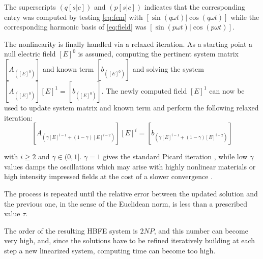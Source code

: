 \documentclass[journal]{IEEEtran}
\begin{document}
\noindent The superscripts $(q[s|c])$ and $(p[s|c])$ indicates that the corresponding
entry was computed by testing \eqref{eq:fem} with $[\sin(q \omega t) | \cos(q \omega t)]$ 
while the corresponding harmonic basis of \eqref{eq:field}
was $[\sin(p \omega t) | \cos(p \omega t)]$.

The nonlinearity is finally handled via a
relaxed iteration. As a starting point a null electric field $[E]^0$ is assumed,
computing the pertinent system matrix $[A_{([E]^0)}]$ and
known term $[b_{([E]^0)}]$ and solving the system $[A_{([E]^0)}] [E]^1 =
[b_{([E]^0)}]$. The newly computed field $[E]^1$ can now be used to update system
matrix and known term and perform the following relaxed iteration:
\begin{equation} \label{eq:lastLinearSystem}
 [A_{(\gamma [E]^{i-1} + (1-\gamma) [E]^{i-2})}] [E]^{i} = [b_{(\gamma [E]^{i-1}
 + (1-\gamma) [E]^{i-2})}]
\end{equation}
% 

\noindent with $i \geq 2$ and
$\gamma\in(0,1]$. $\gamma=1$ gives the standard Picard iteration
\cite{Guarnieri2010}, while low $\gamma$ values damps the oscillations
which may arise with highly nonlinear materials or high intensity impressed
fields at the cost of a slower convergence \cite{Silvester1997}.

The process is repeated until the relative error between the updated solution
and the previous one, in the sense of the Euclidean norm, is less than a
prescribed value $\tau$.

The order of the resulting HBFE system is $2 N P$, and
this number can become very high, and, since the
solutions have to be refined iteratively building at each step a new linearized
system, computing time can become too high. 
\end{document}
